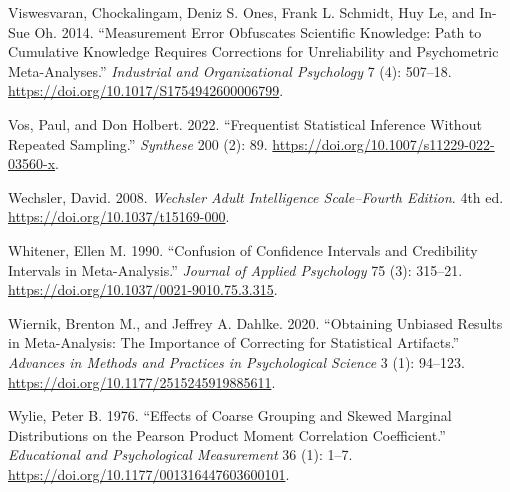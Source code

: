 \documentclass[
  letterpaper,
  DIV=11,
  numbers=noendperiod]{scrreprt}
\newlength{\cslhangindent}
\newlength{\cslentryspacingunit} %
\newenvironment{CSLReferences}[2] %
 {%
  \setlength{\parindent}{0pt}
  \ifodd #1
  \let\oldpar\par
  \def\par{\hangindent=\cslhangindent\oldpar}
  \fi
  \setlength{\parskip}{#2\cslentryspacingunit}
 }%
 {}
\begin{document}
\begin{CSLReferences}{1}{0}
\leavevmode{}%
Viswesvaran, Chockalingam, Deniz S. Ones, Frank L. Schmidt, Huy Le, and
In-Sue Oh. 2014. {``Measurement Error Obfuscates Scientific Knowledge:
Path to Cumulative Knowledge Requires Corrections for Unreliability and
Psychometric Meta-Analyses.''} \emph{Industrial and Organizational
Psychology} 7 (4): 507--18.
\url{https://doi.org/10.1017/S1754942600006799}.

\leavevmode{}%
Vos, Paul, and Don Holbert. 2022. {``Frequentist Statistical Inference
Without Repeated Sampling.''} \emph{Synthese} 200 (2): 89.
\url{https://doi.org/10.1007/s11229-022-03560-x}.

\leavevmode{}%
Wechsler, David. 2008. \emph{Wechsler Adult Intelligence Scale--Fourth
Edition}. 4th ed. \url{https://doi.org/10.1037/t15169-000}.

\leavevmode{}%
Whitener, Ellen M. 1990. {``Confusion of Confidence Intervals and
Credibility Intervals in Meta-Analysis.''} \emph{Journal of Applied
Psychology} 75 (3): 315--21.
\url{https://doi.org/10.1037/0021-9010.75.3.315}.

\leavevmode{}%
Wiernik, Brenton M., and Jeffrey A. Dahlke. 2020. {``Obtaining Unbiased
Results in Meta-Analysis: The Importance of Correcting for Statistical
Artifacts.''} \emph{Advances in Methods and Practices in Psychological
Science} 3 (1): 94--123. \url{https://doi.org/10.1177/2515245919885611}.

\leavevmode{}%
Wylie, Peter B. 1976. {``Effects of Coarse Grouping and Skewed Marginal
Distributions on the Pearson Product Moment Correlation Coefficient.''}
\emph{Educational and Psychological Measurement} 36 (1): 1--7.
\url{https://doi.org/10.1177/001316447603600101}.

\end{CSLReferences}
\end{document}
